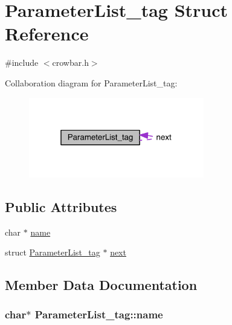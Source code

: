 \hypertarget{struct_parameter_list__tag}{}\section{Parameter\+List\+\_\+tag Struct Reference}
\label{struct_parameter_list__tag}


{\ttfamily \#include $<$crowbar.\+h$>$}



Collaboration diagram for Parameter\+List\+\_\+tag\+:\nopagebreak
\begin{figure}[H]
\begin{center}
\leavevmode
\includegraphics[width=217pt]{struct_parameter_list__tag__coll__graph}
\end{center}
\end{figure}
\subsection*{Public Attributes}
\begin{DoxyCompactItemize}
\item 
char $\ast$ \hyperlink{struct_parameter_list__tag_a704cd205e8ce6762bb2b0ac4b7d1942f}{name}
\item 
struct \hyperlink{struct_parameter_list__tag}{Parameter\+List\+\_\+tag} $\ast$ \hyperlink{struct_parameter_list__tag_a9449cbcacc0fab949f133107943d75d7}{next}
\end{DoxyCompactItemize}


\subsection{Member Data Documentation}
\hypertarget{struct_parameter_list__tag_a704cd205e8ce6762bb2b0ac4b7d1942f}{}
\subsubsection[{name}]{\setlength{\rightskip}{0pt plus 5cm}char$\ast$ Parameter\+List\+\_\+tag\+::name}\label{struct_parameter_list__tag_a704cd205e8ce6762bb2b0ac4b7d1942f}
\hypertarget{struct_parameter_list__tag_a9449cbcacc0fab949f133107943d75d7}{}
